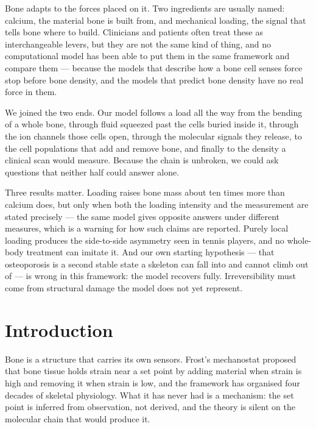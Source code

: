 \documentclass[10pt,letterpaper]{article}
\begin{document}
Bone adapts to the forces placed on it. Two ingredients are usually named:
calcium, the material bone is built from, and mechanical loading, the signal
that tells bone where to build. Clinicians and patients often treat these as
interchangeable levers, but they are not the same kind of thing, and no
computational model has been able to put them in the same framework and
compare them --- because the models that describe how a bone cell senses force
stop before bone density, and the models that predict bone density have no
real force in them.

We joined the two ends. Our model follows a load all the way from the bending
of a whole bone, through fluid squeezed past the cells buried inside it,
through the ion channels those cells open, through the molecular signals they
release, to the cell populations that add and remove bone, and finally to the
density a clinical scan would measure. Because the chain is unbroken, we could
ask questions that neither half could answer alone.

Three results matter. Loading raises bone mass about ten times more than
calcium does, but only when both the loading intensity and the measurement are
stated precisely --- the same model gives opposite answers under different
measures, which is a warning for how such claims are reported. Purely local
loading produces the side-to-side asymmetry seen in tennis players, and no
whole-body treatment can imitate it. And our own starting hypothesis --- that
osteoporosis is a second stable state a skeleton can fall into and cannot
climb out of --- is wrong in this framework: the model recovers fully.
Irreversibility must come from structural damage the model does not yet
represent.

\linenumbers

\section*{Introduction}

Bone is a structure that carries its own sensors. Frost's mechanostat
\cite{frost1987} proposed that bone tissue holds strain near a set point by
adding material when strain is high and removing it when strain is low, and
the framework has organised four decades of skeletal physiology. What it has
never had is a mechanism: the set point is inferred from observation, not
derived, and the theory is silent on the molecular chain that would produce
it.
\end{document}
